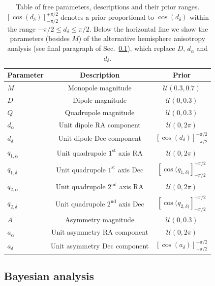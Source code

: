 \documentclass[fleqn,usenatbib,nofootinbib]{mnras}
\begin{document}
\begin{table}\label{tab:params}
\centering
\caption{Table of free parameters, descriptions and their prior ranges. $[\cos(d_\delta)]^{+\pi/2}_{-\pi/2}$ denotes a prior proportional to $\cos(d_\delta)$ within the range $-\pi/2 \le d_\delta \le \pi/2$. Below the horizontal line we show the parameters (besides $M$) of the alternative hemisphere anisotropy analysis (see final paragraph of Sec.~\ref{sec:meth_bayes}), which replace $D$, $d_\alpha$ and $d_\delta.$}
\label{tab:M}
\renewcommand{\arraystretch}{1.5} %
\begin{tabular}{|l|c|c|}
\hline
\textbf{Parameter} & Description & Prior \\
\hline
\texttt{$M$} & Monopole magnitude & $\mathcal{U}(0.3, 0.7)$ \\
\texttt{$D$} & Dipole magnitude & $\mathcal{U}(0,0.3)$ \\
\texttt{$Q$} & Quadrupole magnitude & $\mathcal{U}(0,0.3)$ \\
\texttt{$d_{\alpha}$} & Unit dipole RA component & $\mathcal{U}(0,2\pi)$ \\
\texttt{$d_{\delta}$} & Unit dipole Dec component & $[\cos(d_\delta)]^{+\pi/2}_{-\pi/2}$ \\
\texttt{$q_{1,\alpha}$} & Unit quadrupole $1^\text{st}$ axis RA & $\mathcal{U}(0,2\pi)$ \\
\texttt{$q_{1,\delta}$} & Unit quadrupole $1^\text{st}$ axis Dec & $[\cos(q_{1,\delta)}]^{+\pi/2}_{-\pi/2}$ \\
\texttt{$q_{2,\alpha}$} & Unit quadrupole $2^\text{nd}$ axis RA & $\mathcal{U}(0,2\pi)$ \\
\texttt{$q_{2,\delta}$} & Unit quadrupole $2^\text{nd}$ axis Dec & $[\cos(q_{2,\delta)}]^{+\pi/2}_{-\pi/2}$ \\
\hline
\texttt{$A$} & Asymmetry magnitude & $\mathcal{U}(0,0.3)$ \\
\texttt{$a_{\alpha}$} & Unit asymmetry RA component & $\mathcal{U}(0,2\pi)$ \\
\texttt{$a_{\delta}$} & Unit asymmetry Dec component & $[\cos(a_\delta)]^{+\pi/2}_{-\pi/2}$ \\
\hline
\end{tabular}
\end{table}

\subsection{Bayesian analysis}
\label{sec:meth_bayes}
\end{document}
